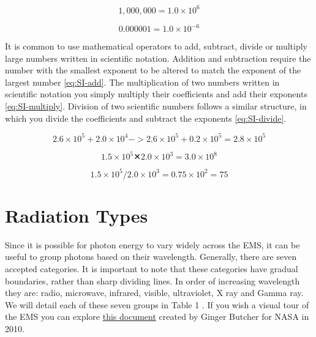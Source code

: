 \documentclass[
]{book}
\begin{document}
\begin{equation}
1,000,000 = 1.0 × 10^{6} 
\label{eq:SI-large}
\end{equation}

\begin{equation}
0.000001 = 1.0 × 10 ^{-6} 
\label{eq:SI-small}
\end{equation}

It is common to use mathematical operators to add, subtract, divide or multiply large numbers written in scientific notation. Addition and subtraction require the number with the smallest exponent to be altered to match the exponent of the largest number \eqref{eq:SI-add}. The multiplication of two numbers written in scientific notation you simply multiply their coefficients and add their exponents \eqref{eq:SI-multiply}. Division of two scientific numbers follows a similar structure, in which you divide the coefficients and subtract the exponents \eqref{eq:SI-divide}.

\begin{equation}
2.6 × 10 ^{5} + 2.0 × 10 ^{4}   ->
2.6 × 10 ^{5} + 0.2 × 10 ^{5} = 2.8 × 10 ^{5} 
\label{eq:SI-add}
\end{equation}

\begin{equation}
1.5 × 10 ^{5} ✕ 2.0 × 10 ^{3} = 3.0 × 10 ^{8} 
\label{eq:SI-multiply}
\end{equation}

\begin{equation}
1.5 × 10 ^{5} / 2.0 × 10 ^{3} = 0.75 × 10 ^{2} = 75
\label{eq:SI-divide}
\end{equation}

\section{Radiation Types}\label{radiation-types}

Since it is possible for photon energy to vary widely across the EMS, it can be useful to group photons based on their wavelength. Generally, there are seven accepted categories. It is important to note that these categories have gradual boundaries, rather than sharp dividing lines. In order of increasing wavelength they are: radio, microwave, infrared, visible, ultraviolet, X ray and Gamma ray. We will detail each of these seven groups in Table 1 \citep{zwinkels_encyclopedia_2020}. If you wish a visual tour of the EMS you can explore \href{https://books.google.ca/books?id=DfLPpxogdM4C&pg=PP1\#v=onepage&q&f=false}{this document} created by Ginger Butcher for NASA in 2010.
\end{document}
